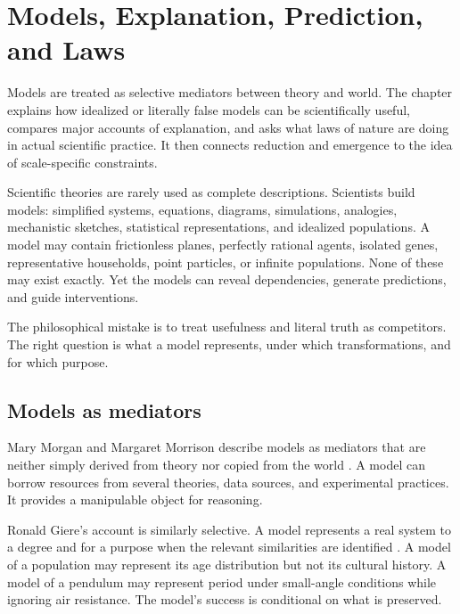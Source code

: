 \chapter{Models, Explanation, Prediction, and Laws}
\label{ch:models}

\begin{chapterguide}
Models are treated as selective mediators between theory and world. The
chapter explains how idealized or literally false models can be scientifically
useful, compares major accounts of explanation, and asks what laws of nature
are doing in actual scientific practice. It then connects reduction and
emergence to the idea of scale-specific constraints.
\end{chapterguide}

Scientific theories are rarely used as complete descriptions. Scientists build
models: simplified systems, equations, diagrams, simulations, analogies,
mechanistic sketches, statistical representations, and idealized populations.
A model may contain frictionless planes, perfectly rational agents, isolated
genes, representative households, point particles, or infinite populations.
None of these may exist exactly. Yet the models can reveal dependencies,
generate predictions, and guide interventions.

The philosophical mistake is to treat usefulness and literal truth as
competitors. The right question is what a model represents, under which
transformations, and for which purpose.

\section{Models as mediators}

Mary Morgan and Margaret Morrison describe models as mediators that are
neither simply derived from theory nor copied from the world
\citep{morganmorrison1999}. A model can borrow resources from several
theories, data sources, and experimental practices. It provides a manipulable
object for reasoning.

Ronald Giere's account is similarly selective. A model represents a real system
to a degree and for a purpose when the relevant similarities are identified
\citep{giere1988,giere2004}. A model of a population may represent its age
distribution but not its cultural history. A model of a pendulum may represent
period under small-angle conditions while ignoring air resistance. The model's
success is conditional on what is preserved.

